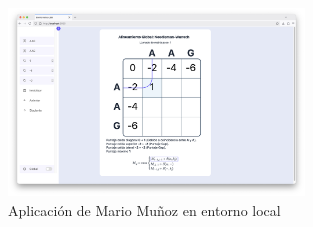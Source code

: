 \documentclass[11pt,a4paper]{article}
\begin{document}
\begin{figure}[H]
	\centering
	\includegraphics[width=0.7\textwidth]{img/Screenshot 2025-05-06 at 23.51.51.png}
	\caption{Aplicación de Mario Muñoz en entorno local}
\end{figure}
\end{document}
